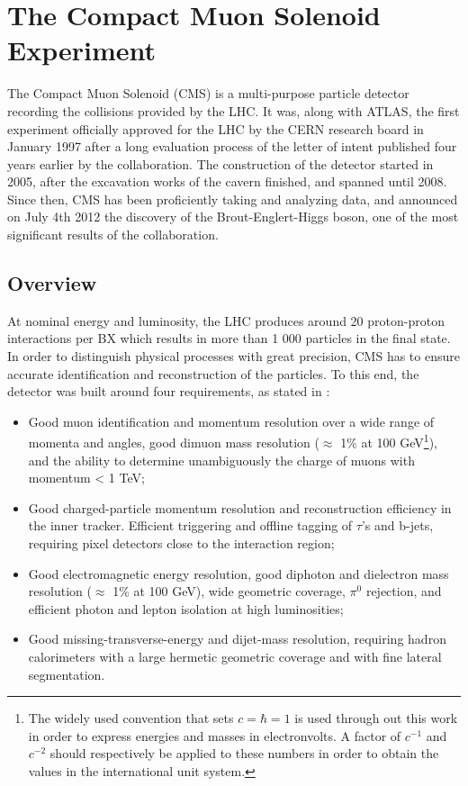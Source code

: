 \chapter{The Compact Muon Solenoid Experiment}
\label{chap:I-3-cms}

	The Compact Muon Solenoid (CMS) \cite{1748-0221-3-08-S08004} is a multi-purpose particle detector recording the collisions provided by the LHC. It was, along with ATLAS, the first experiment officially approved for the LHC by the CERN research board in January 1997 after a long evaluation process of the letter of intent published four years earlier by the collaboration. The construction of the detector started in 2005, after the excavation works of the cavern finished, and spanned until 2008. Since then, CMS has been proficiently taking and analyzing data, and announced on July 4th 2012 the discovery of the Brout-Englert-Higgs boson, one of the most significant results of the collaboration.

  \section{Overview}

    At nominal energy and luminosity, the LHC produces around 20 proton-proton interactions per BX which results in more than 1 000 particles in the final state. In order to distinguish physical processes with great precision, CMS has to ensure accurate identification and reconstruction of the particles. To this end, the detector was built around four requirements, as stated in \cite{1748-0221-3-08-S08004}:
    \begin{itemize}
      \item Good muon identification and momentum resolution over a wide range of momenta and angles, good dimuon mass resolution ($ \approx $ 1\% at 100 GeV\footnote{The widely used convention that sets $ c = \hbar = 1 $ is used through out this work in order to express energies and masses in electronvolts. A factor of $c^{-1}$ and $c^{-2}$ should respectively be applied to these numbers in order to obtain the values in the international unit system.}), and the ability to determine unambiguously the charge of muons with momentum < 1 TeV;
      \item Good charged-particle momentum resolution and reconstruction efficiency in the inner tracker. Efficient triggering and offline tagging of $ \tau $'s and b-jets, requiring pixel detectors close to the interaction region;
      \item Good electromagnetic energy resolution, good diphoton and dielectron mass resolution ($ \approx $ 1\% at 100 GeV), wide geometric coverage, $ \pi^0 $ rejection, and efficient photon and lepton isolation at high luminosities;
      \item Good missing-transverse-energy and dijet-mass resolution, requiring hadron calorimeters with a large hermetic geometric coverage and with fine lateral segmentation. \\
    \end{itemize}

